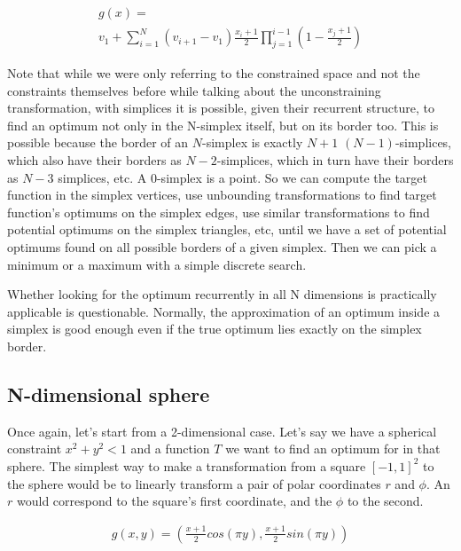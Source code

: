\documentclass[
	a4paper, %
	10pt, %
	unnumberedsections, %
	twoside, %
]{LTJournalArticle}
\begin{document}
\begin{equation}
	\begin{split}
g(x) = \\
v_1 + \sum_{i=1}^{N} (v_{i+1} - v_1) \frac{x_i+1}{2}\prod_{j=1}^{i-1}(1-\frac{x_j+1}{2})
	\end{split}
	\label{eq:simplex_transformation}
\end{equation}

Note that while we were only referring to the constrained space and not the constraints themselves before while talking about the unconstraining transformation, with simplices it is possible, given their recurrent structure, to find an optimum not only in the N-simplex itself, but on its border too. This is possible because the border of an $N$-simplex is exactly $N+1$ $(N-1)$-simplices, which also have their borders as $N-2$-simplices, which in turn have their borders as $N-3$ simplices, etc. A 0-simplex is a point. So we can compute the target function in the simplex vertices, use unbounding transformations to find target function's optimums on the simplex edges, use similar transformations to find potential optimums on the simplex triangles, etc, until we have a set of potential optimums found on all possible borders of a given simplex. Then we can pick a minimum or a maximum with a simple discrete search.

Whether looking for the optimum recurrently in all N dimensions is practically applicable is questionable. Normally, the approximation of an optimum inside a simplex is good enough even if the true optimum lies exactly on the simplex border.

\subsection{N-dimensional sphere}

Once again, let's start from a 2-dimensional case. Let's say we have a spherical constraint $x^2+y^2 < 1$ and a function $T$ we want to find an optimum for in that sphere. The simplest way to make a transformation from a square $[-1, 1]^2$ to the sphere would be to linearly transform a pair of polar coordinates $r$ and $\phi$. An $r$ would correspond to the square's first coordinate, and the $\phi$ to the second.

\begin{equation}
	\begin{split}
g(x, y) = (\frac{x + 1}{2} cos(\pi y), \frac{x + 1}{2} sin(\pi y))
	\end{split}
	\label{eq:spherical_transformation1}
\end{equation}
\end{document}
